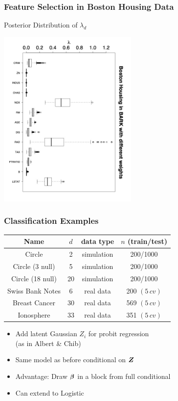 \documentclass[]{beamer}
\newcommand{\bs}[2]{\begin{frame} \frametitle{#1}
{#2}
\end{frame} }
\begin{document}
\bs{Feature Selection in Boston Housing Data} {

Posterior Distribution of $\lambda_d$

\includegraphics[height=3.5in,angle=90]{bhlambdabox}

}
\bs{Classification Examples} {

  \centering
  \begin{tabular}{cccc}
    Name            & $d$ & data type  & $n$ (train/test) \\ \hline
    Circle          &   2 & simulation & 200/1000 \\
    Circle (3 null) &   5 & simulation & 200/1000 \\
    Circle (18 null)&  20 & simulation & 200/1000 \\
    Swiss Bank Notes      &   6 & real data  & 200  $(5\,cv)$ \\
    Breast Cancer   &  30 & real data  & 569 $(5\,cv)$ \\
    Ionosphere      &  33 & real data  & 351 $(5\,cv)$
  \end{tabular}


  \begin{itemize}
  \item Add latent Gaussian $Z_i$ for probit regression \\(as in Albert
  \& Chib)
 \item Same model as before conditional on $\bm Z$
 \item Advantage:  Draw $\bm \beta$ in a block from full conditional
\item Can extend to Logistic
  \end{itemize}

}
\end{document}
